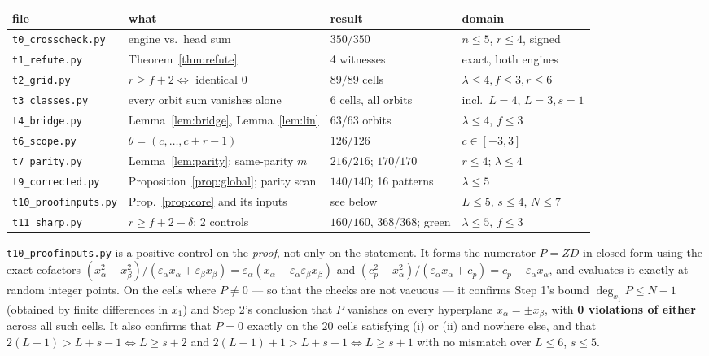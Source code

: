 \documentclass[11pt]{article}
\theoremstyle{definition}
\theoremstyle{remark}
\newcommand{\bftheta}{\theta}
\begin{document}
\begin{center}
\small
\begin{tabular}{llll}
\toprule
file & what & result & domain\\
\midrule
\texttt{t0\_crosscheck.py} & engine vs.\ head sum & $350/350$ & $n\le5$, $r\le4$, signed\\
\texttt{t1\_refute.py} & Theorem~\ref{thm:refute} & 4 witnesses & exact, both engines\\
\texttt{t2\_grid.py} & $r\ge f+2\Leftrightarrow$ identical $0$ & $89/89$ cells & $\lambda\le4,f\le3,r\le6$\\
\texttt{t3\_classes.py} & every orbit sum vanishes alone & $6$ cells, all orbits & incl.\ $L=4$, $L=3,s=1$\\
\texttt{t4\_bridge.py} & Lemma~\ref{lem:bridge}, Lemma~\ref{lem:lin} & $63/63$ orbits & $\lambda\le4$, $f\le3$\\
\texttt{t6\_scope.py} & $\bftheta=(c,\dots,c+r-1)$ & $126/126$ & $c\in[-3,3]$\\
\texttt{t7\_parity.py} & Lemma~\ref{lem:parity}; same-parity $m$ & $216/216$; $170/170$ & $r\le4$; $\lambda\le4$\\
\texttt{t9\_corrected.py} & Proposition~\ref{prop:global}; parity scan & $140/140$; 16 patterns & $\lambda\le5$\\
\texttt{t10\_proofinputs.py} & Prop.~\ref{prop:core} and its inputs & see below & $L\le5$, $s\le4$, $N\le7$\\
\texttt{t11\_sharp.py} & $r\ge f+2-\delta$; 2 controls & $160/160$, $368/368$; green & $\lambda\le5$, $f\le3$\\
\bottomrule
\end{tabular}
\end{center}

\texttt{t10\_proofinputs.py} is a positive control on the \emph{proof}, not only on the
statement. It forms the numerator $P=ZD$ in closed form using the exact cofactors
$(x_\alpha^2-x_\beta^2)/(\varepsilon_\alpha x_\alpha+\varepsilon_\beta x_\beta)
=\varepsilon_\alpha(x_\alpha-\varepsilon_\alpha\varepsilon_\beta x_\beta)$ and
$(c_p^2-x_\alpha^2)/(\varepsilon_\alpha x_\alpha+c_p)=c_p-\varepsilon_\alpha x_\alpha$,
and evaluates it exactly at random integer points. On the cells where $P\neq0$ --- so
that the checks are not vacuous --- it confirms Step 1's bound
$\deg_{x_1}P\le N-1$ (obtained by finite differences in $x_1$) and Step 2's conclusion
that $P$ vanishes on every hyperplane $x_\alpha=\pm x_\beta$, with \textbf{0 violations
of either} across all such cells. It also confirms that $P=0$ exactly on the $20$ cells
satisfying (i) or (ii) and nowhere else, and that $2(L-1)>L+s-1\iff L\ge s+2$ and
$2(L-1)+1>L+s-1\iff L\ge s+1$ with no mismatch over $L\le6$, $s\le5$.
\end{document}
